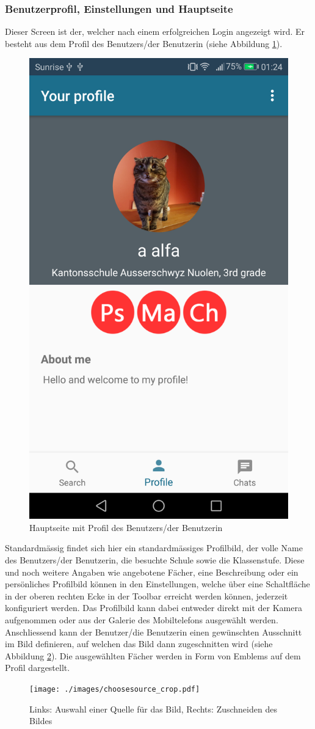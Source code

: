 \documentclass[../main.tex]{subfiles}
\begin{document}
\subsubsection*{Benutzerprofil, Einstellungen und Hauptseite} 
Dieser Screen ist der, welcher nach einem erfolgreichen Login angezeigt wird. Er besteht aus dem Profil des Benutzers/der Benutzerin (siehe Abbildung \ref{mainpage}). 
\begin{figure} 
	\centering
	\includegraphics[width=0.45\linewidth]{./images/mainpage.png}
	\caption{Hauptseite mit Profil des Benutzers/der Benutzerin}
	\label{mainpage}
\end{figure}
Standardmässig findet sich hier ein standardmässiges Profilbild, der volle Name des Benutzers/der Benutzerin, die besuchte Schule sowie die Klassenstufe. Diese und noch weitere Angaben wie angebotene Fächer, eine Beschreibung oder ein persönliches Profilbild können in den Einstellungen, welche über eine Schaltfläche in der oberen rechten Ecke in der Toolbar erreicht werden können, jederzeit konfiguriert werden. Das Profilbild kann dabei entweder direkt mit der Kamera aufgenommen oder aus der Galerie des Mobiltelefons ausgewählt werden. Anschliessend kann der Benutzer/die Benutzerin einen gewünschten Ausschnitt im Bild definieren, auf welchen das Bild dann zugeschnitten wird (siehe Abbildung \ref{choose_crop}). Die ausgewählten Fächer werden in Form von Emblems auf dem Profil dargestellt.
\begin{figure} 
	\centering
	\texttt{[image: ./images/choosesource\_crop.pdf]}
	\caption{Links: Auswahl einer Quelle für das Bild, Rechts: Zuschneiden des Bildes}
	\label{choose_crop}
\end{figure}
\end{document}
